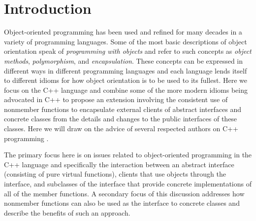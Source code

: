 \documentclass[pdf,ps2pdf,11pt]{SANDreport}
\begin{document}

%
\SANDmain %

%
\section{Introduction}
%

Object-oriented programming has been used and refined for many decades in a
variety of programming languages.  Some of the most basic descriptions of
object orientation speak of {}\textit{programming with objects} and refer to
such concepts as {}\textit{object methods}, {}\textit{polymorphism}, and
{}\textit{encapsulation}.  These concepts can be expressed in different ways
in different programming languages and each language lends itself to different
idioms for how object orientation is to be used to its fullest.  Here we focus
on the C++ language and combine some of the more modern idioms being advocated
in C++ to propose an extension involving the consistent use of nonmember
functions to encapsulate external clients of abstract interfaces and concrete
classes from the details and changes to the public interfaces of these
classes.  Here we will draw on the advice of several respected authors on C++
programming {}\cite{C++CodingStandards05,EffectiveC++3rd}.

The primary focus here is on issues related to object-oriented programming in
the C++ language and specifically the interaction between an abstract
interface (consisting of pure virtual functions), clients that use objects
through the interface, and subclasses of the interface that provide concrete
implementations of all of the member functions.  A secondary focus of this
discussion addresses how nonmember functions can also be used as the interface
to concrete classes and describe the benefits of such an approach.
\end{document}
